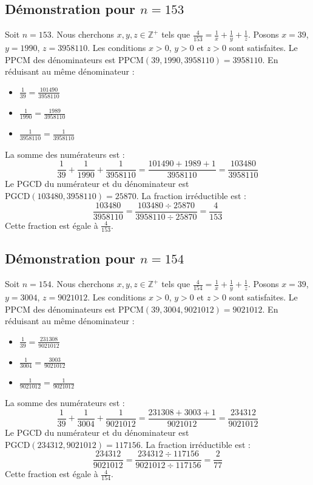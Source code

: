 \documentclass[11pt,a4paper]{article}
\begin{document}
\subsection{Démonstration pour $n = 153$}
Soit $n = 153$. Nous cherchons $x, y, z \in \mathbb{Z}^{+}$ tels que $\frac{4}{153} = \frac{1}{x} + \frac{1}{y} + \frac{1}{z}$.
Posons $x = 39$, $y = 1990$, $z = 3958110$.
Les conditions $x > 0$, $y > 0$ et $z > 0$ sont satisfaites.
Le PPCM des dénominateurs est $\text{PPCM}(39, 1990, 3958110) = 3958110$.
En réduisant au même dénominateur :
\begin{itemize}
    \item $\frac{1}{39} = \frac{101490}{3958110}$
    \item $\frac{1}{1990} = \frac{1989}{3958110}$
    \item $\frac{1}{3958110} = \frac{1}{3958110}$
\end{itemize}
La somme des numérateurs est :
$$ \frac{1}{39} + \frac{1}{1990} + \frac{1}{3958110} = \frac{101490 + 1989 + 1}{3958110} = \frac{103480}{3958110} $$
Le PGCD du numérateur et du dénominateur est $\text{PGCD}(103480, 3958110) = 25870$.
La fraction irréductible est :
$$ \frac{103480}{3958110} = \frac{103480 \div 25870}{3958110 \div 25870} = \frac{4}{153} $$
Cette fraction est égale à $\frac{4}{153}$.

\subsection{Démonstration pour $n = 154$}
Soit $n = 154$. Nous cherchons $x, y, z \in \mathbb{Z}^{+}$ tels que $\frac{4}{154} = \frac{1}{x} + \frac{1}{y} + \frac{1}{z}$.
Posons $x = 39$, $y = 3004$, $z = 9021012$.
Les conditions $x > 0$, $y > 0$ et $z > 0$ sont satisfaites.
Le PPCM des dénominateurs est $\text{PPCM}(39, 3004, 9021012) = 9021012$.
En réduisant au même dénominateur :
\begin{itemize}
    \item $\frac{1}{39} = \frac{231308}{9021012}$
    \item $\frac{1}{3004} = \frac{3003}{9021012}$
    \item $\frac{1}{9021012} = \frac{1}{9021012}$
\end{itemize}
La somme des numérateurs est :
$$ \frac{1}{39} + \frac{1}{3004} + \frac{1}{9021012} = \frac{231308 + 3003 + 1}{9021012} = \frac{234312}{9021012} $$
Le PGCD du numérateur et du dénominateur est $\text{PGCD}(234312, 9021012) = 117156$.
La fraction irréductible est :
$$ \frac{234312}{9021012} = \frac{234312 \div 117156}{9021012 \div 117156} = \frac{2}{77} $$
Cette fraction est égale à $\frac{4}{154}$.
\end{document}
